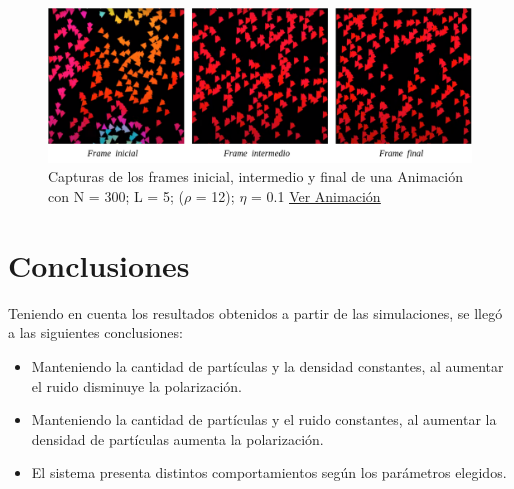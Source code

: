 \documentclass[12pt, a4paper]{report}
\begin{document}
\pagebreak
\begin{figure}[h]
\includegraphics[scale=0.4]{d_big_n_small.png}
\centering 
\caption{Capturas de los frames inicial, intermedio y final de una Animación con N = 300; L = 5; ($\rho$ = 12); $\eta$ = 0.1  \href{https://www.youtube.com/watch?v=CnaNaZNd1MY}{\underline{Ver Animación}}} 
\label{fig:d_big_n_small}
\end{figure}

\section{Conclusiones}
Teniendo en cuenta los resultados obtenidos a partir de las simulaciones, se llegó a las siguientes conclusiones:
\begin{itemize}
    \item Manteniendo la cantidad de partículas y la densidad constantes, al aumentar el ruido disminuye la polarización.
    \item Manteniendo la cantidad de partículas y el ruido constantes, al aumentar la densidad de partículas aumenta la polarización.
    \item El sistema presenta distintos comportamientos según los parámetros elegidos.
\end{itemize}



\end{document}
